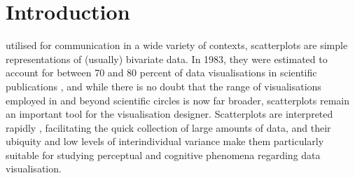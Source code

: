 \documentclass[sigconf]{acmart}
\begin{document}



\maketitle

\setlength{\parskip}{-0.1pt}

\section{Introduction}\label{sec-intro}

utilised for communication in a wide variety of contexts, scatterplots
are simple representations of (usually) bivariate data. In 1983, they
were estimated to account for between 70 and 80 percent of data
visualisations in scientific publications \citep{tufte_1983}, and while
there is no doubt that the range of visualisations employed in and
beyond scientific circles is now far broader, scatterplots remain an
important tool for the visualisation designer. Scatterplots are
interpreted rapidly \citep{rensink_2014}, facilitating the quick
collection of large amounts of data, and their ubiquity
\citep{tufte_1983} and low levels of interindividual variance
\citep{kay_2015} make them particularly suitable for studying perceptual
and cognitive phenomena regarding data visualisation.
\end{document}
